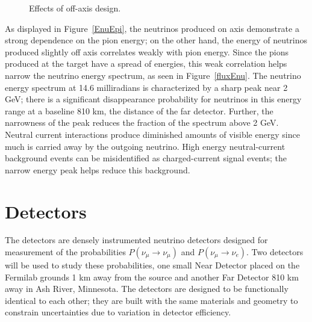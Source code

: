 \begin{figure}[t]
\begin{subfigure}[c]{0.47\textwidth}
        \end{subfigure}
        \caption{Effects of off-axis design.}
\end{figure}As displayed in Figure~\ref{EnuEpi}, the neutrinos produced on axis demonstrate a strong dependence on the pion energy; on the other hand, the energy of neutrinos produced slightly off axis correlates weakly with pion energy.  Since the pions produced at the target have a spread of energies, this weak correlation helps narrow the neutrino energy spectrum, as seen in Figure~\ref{fluxEnu}.  The neutrino energy spectrum at 14.6 milliradians is characterized by a sharp peak near 2 GeV; there is a significant disappearance probability for neutrinos in this energy range at a baseline 810 km, the distance of the far detector.  Further, the narrowness of the peak reduces the fraction of the spectrum above 2 GeV.  Neutral current interactions produce diminished amounts of visible energy since much is carried away by the outgoing neutrino.  High energy neutral-current background events can be misidentified as charged-current signal events; the narrow energy peak helps reduce this background.  
 
\section{\nova Detectors}
\label{sec:detectors}
The \nova detectors are densely instrumented neutrino detectors designed for measurement of the probabilities $P(\nu_\mu \rightarrow \nu_\mu)$ and $P(\nu_\mu \rightarrow \nu_e)$.  Two detectors will be used to study these probabilities, one small Near Detector placed on the Fermilab grounds 1 km away from the \numi source and another Far Detector 810 km away in Ash River, Minnesota.  The detectors are designed to be functionally identical to each other; they are built with the same materials and geometry to constrain uncertainties due to variation in detector efficiency. 

